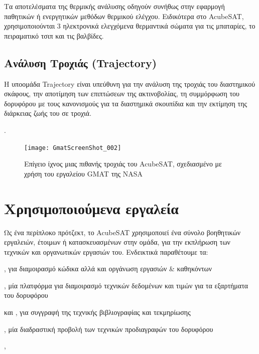 \documentclass[a4paper,nobib]{tufte-book}
\begin{document}
Τα αποτελέσματα της θερμικής ανάλυσης οδηγούν συνήθως στην εφαρμογή παθητικών ή ενεργητικών μεθόδων θερμικού ελέγχου. Ειδικότερα στο AcubeSAT, χρησιμοποιούνται 3 ηλεκτρονικά ελεγχόμενα θερμαντικά σώματα για τις μπαταρίες, το πειραματικό τσιπ και τις βαλβίδες.

\subsection{Ανάλυση Τροχιάς (Trajectory)}

Η υποομάδα Trajectory είναι υπεύθυνη για την ανάλυση της τροχιάς του διαστημικού σκάφους, την αποτίμηση των επιπτώσεων της ακτινοβολίας, τη συμμόρφωση του δορυφόρου με τους κανονισμούς για τα διαστημικά σκουπίδια και την εκτίμηση της διάρκειας ζωής του σε τροχιά.

 \autocite{MDO,anthopoulos_orbital_analysis_2020}.
\begin{figure}
	\texttt{[image: GmatScreenShot\_002]}
	\caption[Επίγειο ίχνος μιας πιθανής τροχιάς του AcubeSAT]{Επίγειο ίχνος μιας πιθανής τροχιάς του AcubeSAT, σχεδιασμένο με χρήση του εργαλείου \acl{GMAT} της NASA}
	\label{fig:gmat}
\end{figure}


\section{Χρησιμοποιούμενα εργαλεία}

Ως ένα περίπλοκο πρότζεκτ, το AcubeSAT χρησιμοποιεί ένα σύνολο βοηθητικών εργαλειών, έτοιμων ή κατασκευασμένων στην ομάδα, για την εκπλήρωση των τεχνικών και οργανωτικών εργασιών του. Ενδεικτικά παραθέτουμε τα:
\begin{compactitem}
	\item {}, για διαμοιρασμό κώδικα αλλά και οργάνωση εργασιών \& καθηκόντων
	\item {}, μία πλατφόρμα για διαμοιρασμό τεχνικών δεδομένων και τιμών για τα εξαρτήματα του δορυφόρου
	\item  {} και , για συγγραφή της τεχνικής βιβλιογραφίας και τεκμηρίωσης
	\item {}, μία διαδραστική προβολή των τεχνικών προδιαγραφών του δορυφόρου
	\item {}, 
\end{compactitem}
\end{document}

